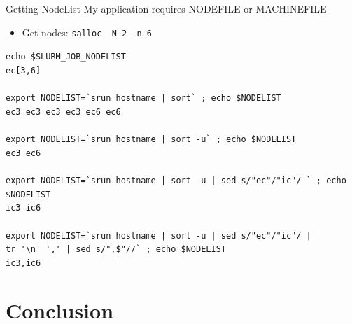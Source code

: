 \documentclass[10pt,compress]{beamer}
\begin{document}
\begin{frame}[fragile]{Getting NodeList}
My application requires NODEFILE or MACHINEFILE
\pause
\begin{itemize}
    \item  Get nodes: \verb.salloc -N 2 -n 6. 
 \end{itemize}
  \pause
\bigskip
 {
  \scriptsize
   
  \verb.echo $SLURM_JOB_NODELIST. \\
  \pause
  \verb-ec[3,6]-
  \pause
  \\\ \\
   \verb.export NODELIST=`srun hostname | sort` ; echo $NODELIST. \\
  \pause
  \verb-ec3 ec3 ec3 ec3 ec6 ec6-
  \pause
\\\ \\
     \verb.export NODELIST=`srun hostname | sort -u` ; echo $NODELIST. \\
  \pause
  \verb-ec3 ec6-
  \pause
\\\ \\
     \verb.export NODELIST=`srun hostname | sort -u | sed s/"ec"/"ic"/ ` ; echo $NODELIST.\\
  \pause
  \verb-ic3 ic6-
\pause
\\\ \\
     \verb.export NODELIST=`srun hostname | sort -u | sed s/"ec"/"ic"/ |.
     \verb.                             tr '\n' ',' | sed s/",$"//` ; echo $NODELIST.\\
  \pause
  \verb-ic3,ic6-
  }

  
  

\end{frame}


\section{Conclusion}
\end{document}
